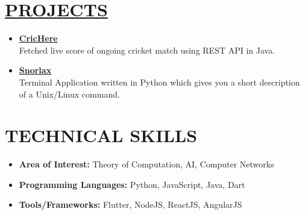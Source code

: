\documentclass[line, margin, 12pt]{res}
\begin{document}
\begin{resume}
\section{\hyperref[https://www.github.com/darshansharma]{PROJECTS}}
\begin{itemize}
\item \textbf{\href{https://github.com/darshansharma/CricHere/blob/master/src/test/Test.java}{CricHere}}\\
Fetched live score of ongoing cricket match using REST API in Java.
\item \textbf{\href{https://github.com/darshansharma/snorlax}{Snorlax}}\\
Terminal Application written in Python which gives you a short description of a Unix/Linux command.
\end{itemize}

\section{TECHNICAL SKILLS}
\begin{itemize}
\item \textbf{Area of Interest:} Theory of Computation, AI, Computer Networks
\item \textbf{Programming Languages:}  Python, JavaScript, Java, Dart
\item \textbf{Tools/Frameworks:} Flutter,  NodeJS, ReactJS, AngularJS\\
\end{itemize}

\end{resume}
\end{document}
